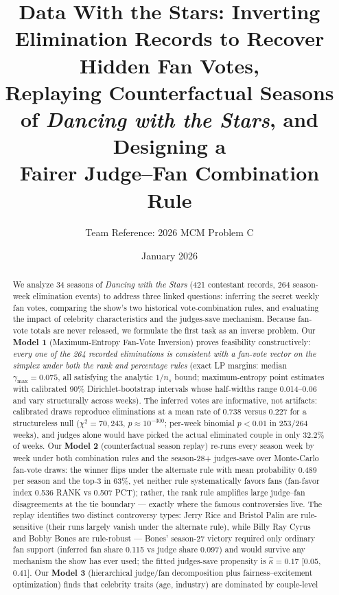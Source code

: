 \documentclass[11pt]{article}
\title{Data With the Stars: Inverting Elimination Records to Recover Hidden Fan Votes,\\
Replaying Counterfactual Seasons of \textit{Dancing with the Stars}, and Designing a\\
Fairer Judge--Fan Combination Rule}
\author{Team Reference: 2026 MCM Problem C}
\date{January 2026}
\begin{document}
\maketitle

\begin{abstract}
\noindent
We analyze 34 seasons of \textit{Dancing with the Stars} (421 contestant records,
264 season-week elimination events) to address three linked questions: inferring the
secret weekly fan votes, comparing the show's two historical vote-combination rules,
and evaluating the impact of celebrity characteristics and the judges-save mechanism.
Because fan-vote totals are never released, we formulate the first task as an inverse
problem. Our \textbf{Model 1} (Maximum-Entropy Fan-Vote Inversion) proves feasibility
constructively: \emph{every one of the 264 recorded eliminations is consistent with a
fan-vote vector on the simplex under both the rank and percentage rules} (exact LP
margins: median $\gamma_{\max} = 0.075$, all satisfying the analytic $1/n_s$ bound;
maximum-entropy point estimates with calibrated 90\% Dirichlet-bootstrap intervals whose
half-widths range 0.014--0.06 and vary structurally across weeks). The inferred votes
are informative, not artifacts: calibrated draws reproduce eliminations at a mean rate
of 0.738 versus 0.227 for a structureless null ($\chi^2 = 70{,}243$, $p \approx
10^{-300}$; per-week binomial $p < 0.01$ in 253/264 weeks), and judges alone would have
picked the actual eliminated couple in only 32.2\% of weeks. Our \textbf{Model 2}
(counterfactual season replay) re-runs every season week by week under both combination
rules and the season-28+ judges-save over Monte-Carlo fan-vote draws: the winner flips
under the alternate rule with mean probability 0.489 per season and the top-3 in 63\%,
yet neither rule systematically favors fans (fan-favor index 0.536 RANK vs 0.507 PCT);
rather, the rank rule amplifies large judge--fan disagreements at the tie boundary
--- exactly where the famous controversies live. The replay identifies two distinct
controversy types: Jerry Rice and Bristol Palin are rule-sensitive (their runs largely
vanish under the alternate rule), while Billy Ray Cyrus and Bobby Bones are
rule-robust --- Bones' season-27 victory required only ordinary fan support (inferred
fan share 0.115 vs judge share 0.097) and would survive any mechanism the show has
ever used; the fitted judges-save propensity is $\hat\kappa = 0.17$ [0.05, 0.41].
Our \textbf{Model 3} (hierarchical judge/fan decomposition plus fairness--excitement
optimization) finds that celebrity traits (age, industry) are dominated by couple-level

\end{abstract}
\end{document}
